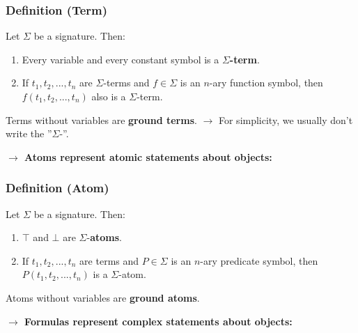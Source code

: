 \documentclass[conference, a4paper]{styles/acmsiggraph}
\begin{document}
        \subsubsection{Definition (Term)}
            Let $\Sigma$ be a signature. Then:
            \begin{enumerate}
                \item Every variable and every constant symbol is a \textbf{$\Sigma$-term}.
                \item If $t_1,t_2,...,t_n$ are $\Sigma$-terms and $f \in \Sigma$ is an $n$-ary function symbol, then $f(t_1,t_2,...,t_n)$ also is a $\Sigma$-term.
            \end{enumerate}
            Terms without variables are \textbf{ground terms}.\newline
        $\rightarrow$ For simplicity, we usually don't write the ''$\Sigma$-''.\newline
        
        \textbf{$\rightarrow$ Atoms represent atomic statements about objects:}
        \subsubsection{Definition (Atom)}
            Let $\Sigma$ be a signature. Then:
            \begin{enumerate}
                \item $\top$ and $\bot$ are $\Sigma$-\textbf{atoms}.
                \item If $t_1,t_2,...,t_n$ are terms and $P \in \Sigma$ is an $n$-ary predicate symbol, then $P(t_1,t_2,...,t_n)$ is a $\Sigma$-atom.
            \end{enumerate}
            Atoms without variables are \textbf{ground atoms}.
        
        \textbf{$\rightarrow$ Formulas represent complex statements about objects:}
\end{document}
